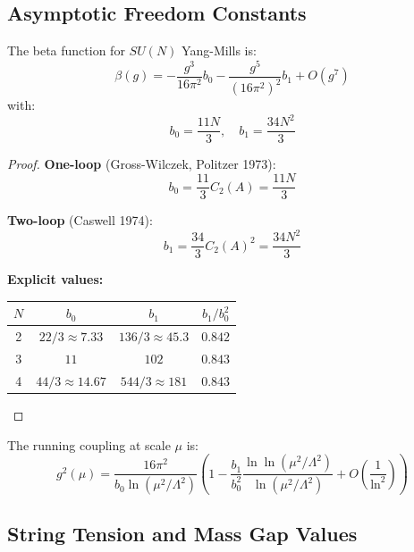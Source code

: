 \subsection{Asymptotic Freedom Constants}

\begin{theorem}
\label{thm:beta-function-explicit}
The beta function for $SU(N)$ Yang-Mills is:
\[
\beta(g) = -\frac{g^3}{16\pi^2} b_0 - \frac{g^5}{(16\pi^2)^2} b_1 + O(g^7)
\]
with:
\[
\boxed{b_0 = \frac{11N}{3}, \quad b_1 = \frac{34N^2}{3}}
\]
\end{theorem}

\begin{proof}
\textbf{One-loop} (Gross-Wilczek, Politzer 1973):
\[
b_0 = \frac{11}{3} C_2(A) = \frac{11N}{3}
\]

\textbf{Two-loop} (Caswell 1974):
\[
b_1 = \frac{34}{3} C_2(A)^2 = \frac{34N^2}{3}
\]

\textbf{Explicit values:}
\begin{center}
\begin{tabular}{|c|c|c|c|}
\hline
$N$ & $b_0$ & $b_1$ & $b_1/b_0^2$ \\
\hline
2 & $22/3 \approx 7.33$ & $136/3 \approx 45.3$ & $0.842$ \\
3 & $11$ & $102$ & $0.843$ \\
4 & $44/3 \approx 14.67$ & $544/3 \approx 181$ & $0.843$ \\
\hline
\end{tabular}
\end{center}
\end{proof}

\begin{theorem}
\label{thm:running-coupling-explicit}
The running coupling at scale $\mu$ is:
\[
\boxed{g^2(\mu) = \frac{16\pi^2}{b_0 \ln(\mu^2/\Lambda^2)} \left(1 - \frac{b_1}{b_0^2} \frac{\ln\ln(\mu^2/\Lambda^2)}{\ln(\mu^2/\Lambda^2)} + O\left(\frac{1}{\ln^2}\right)\right)}
\]
\end{theorem}

\subsection{String Tension and Mass Gap Values}


